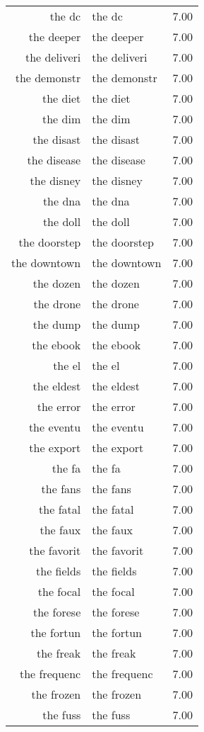 \begin{table}[ht]
\begin{tabular}{rlr}
  the dc & the dc & 7.00 \\ 
  the deeper & the deeper & 7.00 \\ 
  the deliveri & the deliveri & 7.00 \\ 
  the demonstr & the demonstr & 7.00 \\ 
  the diet & the diet & 7.00 \\ 
  the dim & the dim & 7.00 \\ 
  the disast & the disast & 7.00 \\ 
  the disease & the disease & 7.00 \\ 
  the disney & the disney & 7.00 \\ 
  the dna & the dna & 7.00 \\ 
  the doll & the doll & 7.00 \\ 
  the doorstep & the doorstep & 7.00 \\ 
  the downtown & the downtown & 7.00 \\ 
  the dozen & the dozen & 7.00 \\ 
  the drone & the drone & 7.00 \\ 
  the dump & the dump & 7.00 \\ 
  the ebook & the ebook & 7.00 \\ 
  the el & the el & 7.00 \\ 
  the eldest & the eldest & 7.00 \\ 
  the error & the error & 7.00 \\ 
  the eventu & the eventu & 7.00 \\ 
  the export & the export & 7.00 \\ 
  the fa & the fa & 7.00 \\ 
  the fans & the fans & 7.00 \\ 
  the fatal & the fatal & 7.00 \\ 
  the faux & the faux & 7.00 \\ 
  the favorit & the favorit & 7.00 \\ 
  the fields & the fields & 7.00 \\ 
  the focal & the focal & 7.00 \\ 
  the forese & the forese & 7.00 \\ 
  the fortun & the fortun & 7.00 \\ 
  the freak & the freak & 7.00 \\ 
  the frequenc & the frequenc & 7.00 \\ 
  the frozen & the frozen & 7.00 \\ 
  the fuss & the fuss & 7.00 \\ 

\end{tabular}
\end{table}
